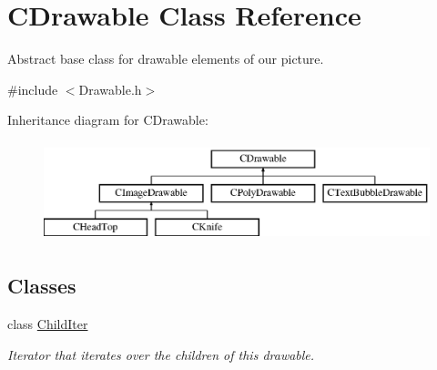\hypertarget{class_c_drawable}{\section{C\+Drawable Class Reference}
\label{class_c_drawable}
}


Abstract base class for drawable elements of our picture.  




{\ttfamily \#include $<$Drawable.\+h$>$}

Inheritance diagram for C\+Drawable\+:\begin{figure}[H]
\begin{center}
\leavevmode
\includegraphics[height=2.896552cm]{class_c_drawable}
\end{center}
\end{figure}
\subsection*{Classes}
\begin{DoxyCompactItemize}
\item 
class \hyperlink{class_c_drawable_1_1_child_iter}{Child\+Iter}
\begin{DoxyCompactList}\small\item\em Iterator that iterates over the children of this drawable. \end{DoxyCompactList}\end{DoxyCompactItemize}
